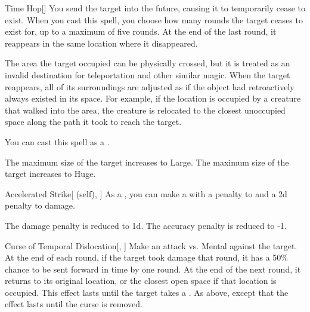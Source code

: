 \lowercase{\hypertarget{spell:Time Hop}{}}\label{spell:Time Hop}
\begin{freeability}[Rank 3]{\hypertarget{spell:Time Hop}{Time Hop}}[]
You send the target into the future, causing it to temporarily cease to exist.
When you cast this spell, you choose how many rounds the target ceases to exist for, up to a maximum of five rounds.
At the end of the last round, it reappears in the same location where it disappeared.

The area the target occupied can be physically crossed, but it is treated as an invalid destination for teleportation and other similar magic.
When the target reappears, all of its surroundings are adjusted as if the object had retroactively always existed in its space.
For example, if the location is occupied by a creature that walked into the area, the creature is relocated to the closest unoccupied space along the path it took to reach the target.

You can cast this spell as a .

\rankline
{} The maximum size of the target increases to Large.
 The maximum size of the target increases to Huge.
\end{freeability}
\vspace{0.25em}



\lowercase{\hypertarget{spell:Accelerated Strike}{}}\label{spell:Accelerated Strike}
\begin{attuneability}[Rank 4]{\hypertarget{spell:Accelerated Strike}{Accelerated Strike}}[ (self), ]
As a , you can make a  with a  penalty to  and a \minus2d penalty to damage.

\rankline
{} The damage penalty is reduced to \minus1d.
 The accuracy penalty is reduced to -1.
\end{attuneability}
\vspace{0.25em}



\lowercase{\hypertarget{spell:Curse of Temporal Dislocation}{}}\label{spell:Curse of Temporal Dislocation}
\begin{freeability}[Rank 4]{\hypertarget{spell:Curse of Temporal Dislocation}{Curse of Temporal Dislocation}}[, ]
Make an attack vs. Mental against the target.
\hit At the end of each round, if the target took damage that round, it has a 50\% chance to be sent forward in time by one round.
At the end of the next round, it returns to its original location, or the closest open space if that location is occupied.
This effect lasts until the target takes a .
\crit As above, except that the effect lasts until the curse is removed.
\end{freeability}
\vspace{0.25em}



